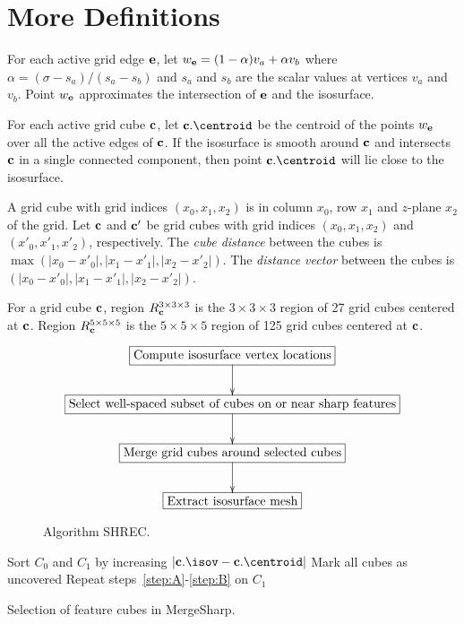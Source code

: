 
\section{More Definitions}

For each active grid edge $\mathbf{e}$,
let $w_{\mathbf{e}} = (1-\alpha) v_a + \alpha v_b$
where $\alpha = (\sigma - s_a)/(s_a-s_b)$
and $s_a$ and $s_b$ are the scalar values at vertices $v_a$ and $v_b$.
Point $w_{\mathbf{e}}$ approximates the intersection of $\mathbf{e}$ and the isosurface.

For each active grid cube $\mathbf{c}$,
let $\cb.\centroid$ be the centroid of the points $w_{\mathbf{e}}$
over all the active edges of $\mathbf{c}$.
If the isosurface is smooth around $\mathbf{c}$
and intersects $\mathbf{c}$ in a single connected component,
then point $\cb.\centroid$ will lie close to the isosurface.

A grid cube with grid indices $(x_0,x_1,x_2)$ is in column $x_0$, row $x_1$
and $z$-plane $x_2$ of the grid.
Let $\mathbf{c}$ and $\mathbf{c}'$ be grid cubes with grid indices $(x_0,x_1,x_2)$
and $(x'_0,x'_1,x'_2)$, respectively.
The {\em cube distance} between the cubes 
is $\max(|x_0-x'_0|, |x_1-x'_1|, |x_2-x'_2|)$.
The {\em distance vector} between the cubes is
$(|x_0-x'_0|, |x_1-x'_1|, |x_2-x'_2|)$.

For a grid cube $\mathbf{c}$, region $R^{3 \times 3 \times 3}_{\mathbf{c}}$ is the $3 \times 3 \times 3$ region
of 27 grid cubes centered at $\mathbf{c}$.
Region $R^{5 \times 5 \times 5}_{\mathbf{c}}$ is the $5 \times 5 \times 5$ region
of 125 grid cubes centered at $\mathbf{c}$.


\begin{figure}
\begin{equation*}
\xymatrix{
\action{Compute isosurface vertex locations} \ar[d] \\
\action{Select well-spaced subset of cubes on or near sharp features} \ar[d] \\
\action{Merge grid cubes around selected cubes} \ar[d] \\
\action{Extract isosurface mesh}
}
\end{equation*}
\caption{Algorithm SHREC.}
\label{alg:shrec}
\end{figure}


\begin{algorithm}[t]
Sort $C_0$ and $C_1$ by increasing $|\cb.\isov-\cb.\centroid|$\;
Mark all cubes as uncovered\;
\label{step:B}
Repeat steps~\ref{step:A}-\ref{step:B} on $C_1$\;
\caption{Selection of feature cubes in MergeSharp.}
\label{alg:mergesharp_select}
\end{algorithm}


